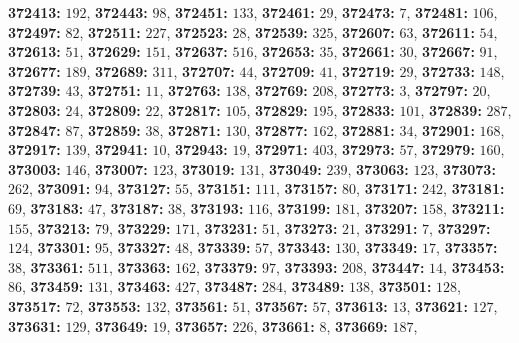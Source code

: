 \textsf{\bfseries 372413:} $192$, \textsf{\bfseries 372443:} $98$, \textsf{\bfseries 372451:} $133$, \textsf{\bfseries 372461:} $29$, \textsf{\bfseries 372473:} $7$, \textsf{\bfseries 372481:} $106$, \textsf{\bfseries 372497:} $82$, \textsf{\bfseries 372511:} $227$, \textsf{\bfseries 372523:} $28$, \textsf{\bfseries 372539:} $325$, \textsf{\bfseries 372607:} $63$, \textsf{\bfseries 372611:} $54$, \textsf{\bfseries 372613:} $51$, \textsf{\bfseries 372629:} $151$, \textsf{\bfseries 372637:} $516$, \textsf{\bfseries 372653:} $35$, \textsf{\bfseries 372661:} $30$, \textsf{\bfseries 372667:} $91$, \textsf{\bfseries 372677:} $189$, \textsf{\bfseries 372689:} $311$, \textsf{\bfseries 372707:} $44$, \textsf{\bfseries 372709:} $41$, \textsf{\bfseries 372719:} $29$, \textsf{\bfseries 372733:} $148$, \textsf{\bfseries 372739:} $43$, \textsf{\bfseries 372751:} $11$, \textsf{\bfseries 372763:} $138$, \textsf{\bfseries 372769:} $208$, \textsf{\bfseries 372773:} $3$, \textsf{\bfseries 372797:} $20$, \textsf{\bfseries 372803:} $24$, \textsf{\bfseries 372809:} $22$, \textsf{\bfseries 372817:} $105$, \textsf{\bfseries 372829:} $195$, \textsf{\bfseries 372833:} $101$, \textsf{\bfseries 372839:} $287$, \textsf{\bfseries 372847:} $87$, \textsf{\bfseries 372859:} $38$, \textsf{\bfseries 372871:} $130$, \textsf{\bfseries 372877:} $162$, \textsf{\bfseries 372881:} $34$, \textsf{\bfseries 372901:} $168$, \textsf{\bfseries 372917:} $139$, \textsf{\bfseries 372941:} $10$, \textsf{\bfseries 372943:} $19$, \textsf{\bfseries 372971:} $403$, \textsf{\bfseries 372973:} $57$, \textsf{\bfseries 372979:} $160$, \textsf{\bfseries 373003:} $146$, \textsf{\bfseries 373007:} $123$, \textsf{\bfseries 373019:} $131$, \textsf{\bfseries 373049:} $239$, \textsf{\bfseries 373063:} $123$, \textsf{\bfseries 373073:} $262$, \textsf{\bfseries 373091:} $94$, \textsf{\bfseries 373127:} $55$, \textsf{\bfseries 373151:} $111$, \textsf{\bfseries 373157:} $80$, \textsf{\bfseries 373171:} $242$, \textsf{\bfseries 373181:} $69$, \textsf{\bfseries 373183:} $47$, \textsf{\bfseries 373187:} $38$, \textsf{\bfseries 373193:} $116$, \textsf{\bfseries 373199:} $181$, \textsf{\bfseries 373207:} $158$, \textsf{\bfseries 373211:} $155$, \textsf{\bfseries 373213:} $79$, \textsf{\bfseries 373229:} $171$, \textsf{\bfseries 373231:} $51$, \textsf{\bfseries 373273:} $21$, \textsf{\bfseries 373291:} $7$, \textsf{\bfseries 373297:} $124$, \textsf{\bfseries 373301:} $95$, \textsf{\bfseries 373327:} $48$, \textsf{\bfseries 373339:} $57$, \textsf{\bfseries 373343:} $130$, \textsf{\bfseries 373349:} $17$, \textsf{\bfseries 373357:} $38$, \textsf{\bfseries 373361:} $511$, \textsf{\bfseries 373363:} $162$, \textsf{\bfseries 373379:} $97$, \textsf{\bfseries 373393:} $208$, \textsf{\bfseries 373447:} $14$, \textsf{\bfseries 373453:} $86$, \textsf{\bfseries 373459:} $131$, \textsf{\bfseries 373463:} $427$, \textsf{\bfseries 373487:} $284$, \textsf{\bfseries 373489:} $138$, \textsf{\bfseries 373501:} $128$, \textsf{\bfseries 373517:} $72$, \textsf{\bfseries 373553:} $132$, \textsf{\bfseries 373561:} $51$, \textsf{\bfseries 373567:} $57$, \textsf{\bfseries 373613:} $13$, \textsf{\bfseries 373621:} $127$, \textsf{\bfseries 373631:} $129$, \textsf{\bfseries 373649:} $19$, \textsf{\bfseries 373657:} $226$, \textsf{\bfseries 373661:} $8$, \textsf{\bfseries 373669:} $187$, 
